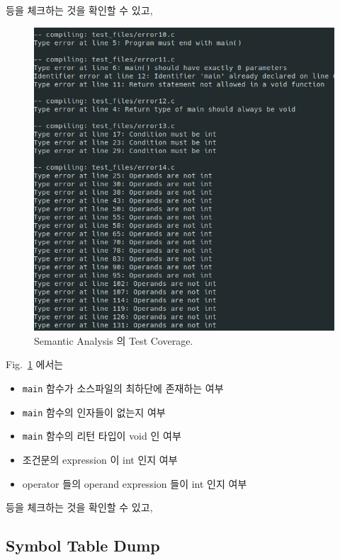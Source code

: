 \documentclass[a4paper, 12p]{paper}
\def\code#1{\texttt{#1}}
\begin{document}
등을 체크하는 것을 확인할 수 있고, 

\begin{figure}[H]
  \centering
\includegraphics[scale=0.5]{figs/coverage3.png}
\caption{Semantic Analysis 의 Test Coverage.}\label{fig:coverage3}
\end{figure}

Fig.~\ref{fig:coverage3} 에서는

\begin{itemize}
\item \code{main} 함수가 소스파일의 최하단에 존재하는 여부 
\item \code{main} 함수의 인자들이 없는지 여부
\item \code{main} 함수의 리턴 타입이 void 인 여부
\item 조건문의 expression 이 int 인지 여부
\item operator 들의 operand expression 들이 int 인지 여부
\end{itemize}

등을 체크하는 것을 확인할 수 있고, 

\subsection{Symbol Table Dump}
\end{document}
